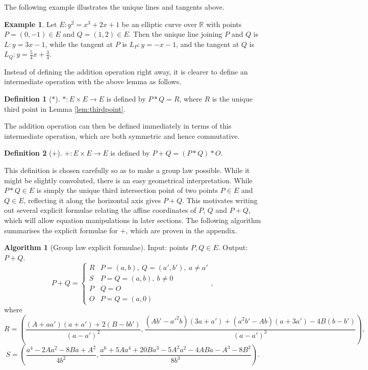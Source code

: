 \documentclass{article}
\newcommand{\R}{\mathbb{R}}
\newcommand{\rb}[1]{\left( #1 \right)}
\theoremstyle{definition}\newtheorem*{definition}{Definition}
\theoremstyle{definition}\newtheorem*{example}{Example}
\theoremstyle{definition}\newtheorem*{remark}{Remark}
\newtheorem{algorithm}[proposition]{Algorithm}
\begin{document}
The following example illustrates the unique lines and tangents above.

\begin{example}
Let $ E : y^2 = x^3 + 2x + 1 $ be an elliptic curve over $ \R $ with points $ P = \rb{0, -1} \in E $ and $ Q = \rb{1, 2} \in E $. Then the unique line joining $ P $ and $ Q $ is $ L : y = 3x - 1 $, while the tangent at $ P $ is $ L_P : y = -x - 1 $, and the tangent at $ Q $ is $ L_Q : y = \tfrac{5}{4}x + \tfrac{3}{4} $.
\end{example}

Instead of defining the addition operation right away, it is clearer to define an intermediate operation with the above lemma as follows.

\begin{definition}[$ * $]
$ * : E \times E \to E $ is defined by $ P * Q = R $, where $ R $ is the unique third point in Lemma \ref{lem:thirdpoint}.
\end{definition}

The addition operation can then be defined immediately in terms of this intermediate operation, which are both symmetric and hence commutative.

\begin{definition}[$ + $]
$ + : E \times E \to E $ is defined by $ P + Q = \rb{P * Q} * O $.
\end{definition}

This definition is chosen carefully so as to make a group law possible. While it might be slightly convoluted, there is an easy geometrical interpretation. While $ P * Q \in E $ is simply the unique third intersection point of two points $ P \in E $ and $ Q \in E $, reflecting it along the horizontal axis gives $ P + Q $. This motivates writing out several explicit formulae relating the affine coordinates of $ P $, $ Q $ and $ P + Q $, which will allow equation manipulations in later sections. The following algorithm summarises the explicit formulae for $ + $, which are proven in the appendix.

\begin{algorithm}[Group law explicit formulae]
Input: points $ P, Q \in E $. Output: $ P + Q $.
$$ P + Q = \begin{cases} R & P = \rb{a, b}, \ Q = \rb{a', b'}, \ a \ne a' \\ S & P = Q = \rb{a, b}, \ b \ne 0 \\ P & Q = O \\ O & P = Q = \rb{a, 0} \end{cases}, $$
where
$$ R = \rb{\dfrac{\rb{A + aa'}\rb{a + a'} + 2\rb{B - bb'}}{\rb{a - a'}^2}, \dfrac{\rb{Ab' - a'^2b}\rb{3a + a'} + \rb{a^2b' - Ab}\rb{a + 3a'} - 4B\rb{b - b'}}{\rb{a - a'}^3}}, $$
$$ S = \rb{\dfrac{a^4 - 2Aa^2 - 8Ba + A^2}{4b^2}, \dfrac{a^6 + 5Aa^4 + 20Ba^3 - 5A^2a^2 - 4ABa - A^3 - 8B^2}{8b^3}}. $$
\end{algorithm}
\end{document}
